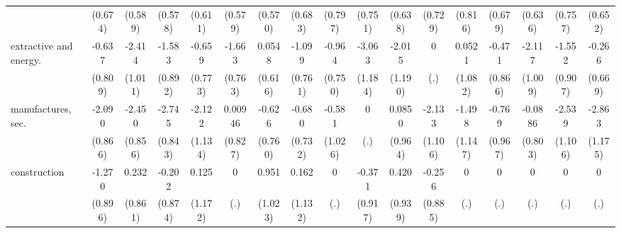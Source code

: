 {\begin{tabular}{l*{16}{c}}
                    &     (0.674)         &     (0.589)         &     (0.578)         &     (0.611)         &     (0.579)         &     (0.570)         &     (0.683)         &     (0.797)         &     (0.751)         &     (0.638)         &     (0.729)         &     (0.816)         &     (0.679)         &     (0.636)         &     (0.757)         &     (0.652)         \\
[1em]
extractive and energy.&      -0.637         &      -2.414\sym{*}  &      -1.583         &      -0.659         &      -1.663\sym{*}  &      0.0548         &      -1.099         &      -0.964         &      -3.063\sym{**} &      -2.015         &           0         &      0.0521         &      -0.471         &      -2.117\sym{*}  &      -1.552         &      -0.266         \\
                    &     (0.809)         &     (1.011)         &     (0.892)         &     (0.773)         &     (0.763)         &     (0.616)         &     (0.761)         &     (0.750)         &     (1.184)         &     (1.190)         &         (.)         &     (1.082)         &     (0.866)         &     (1.009)         &     (0.907)         &     (0.669)         \\
[1em]
manufactures, sec.  &      -2.090\sym{*}  &      -2.450\sym{**} &      -2.745\sym{**} &      -2.122         &     0.00946         &      -0.626         &      -0.680         &      -0.581         &           0         &      0.0850         &      -2.133         &      -1.498         &      -0.769         &     -0.0886         &      -2.539\sym{*}  &      -2.863\sym{*}  \\
                    &     (0.866)         &     (0.856)         &     (0.843)         &     (1.134)         &     (0.827)         &     (0.760)         &     (0.732)         &     (1.026)         &         (.)         &     (0.964)         &     (1.106)         &     (1.147)         &     (0.967)         &     (0.803)         &     (1.106)         &     (1.175)         \\
[1em]
construction        &      -1.270         &       0.232         &      -0.202         &       0.125         &           0         &       0.951         &       0.162         &           0         &      -0.371         &       0.420         &      -0.256         &           0         &           0         &           0         &           0         &           0         \\
                    &     (0.896)         &     (0.861)         &     (0.874)         &     (1.172)         &         (.)         &     (1.023)         &     (1.132)         &         (.)         &     (0.917)         &     (0.939)         &     (0.885)         &         (.)         &         (.)         &         (.)         &         (.)         &         (.)         \\

\end{tabular}}
